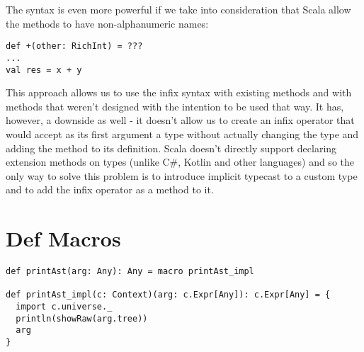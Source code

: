The syntax is even more powerful if we take into consideration that Scala allow the methods to have non-alphanumeric names:

\lstset{style=Scala}
\begin{lstlisting}
def +(other: RichInt) = ???
...
val res = x + y
\end{lstlisting}

This approach allows us to use the infix syntax with existing methods and with methods that weren't designed with the intention to be used that way. It has, however, a downside as well - it doesn't allow us to create an infix operator that would accept as its first argument a type without actually changing the type and adding the method to its definition. Scala doesn't directly support declaring extension methods on types (unlike C\#, Kotlin and other languages) and so the only way to solve this problem is to introduce implicit typecast to a custom type and to add the infix operator as a method to it.


\section{Def Macros}

\lstset{style=Scala}
\begin{lstlisting}
def printAst(arg: Any): Any = macro printAst_impl

def printAst_impl(c: Context)(arg: c.Expr[Any]): c.Expr[Any] = {
  import c.universe._
  println(showRaw(arg.tree))
  arg
}
\end{lstlisting}